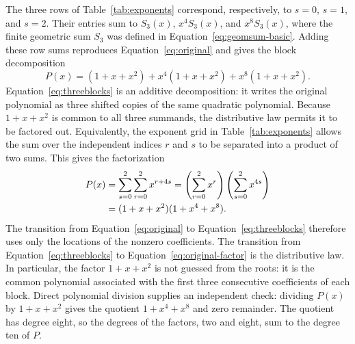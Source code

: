 \documentclass[11pt,a4paper]{article}
\numberwithin{equation}{section}
\theoremstyle{uprightpaper}
\begin{document}
The three rows of Table~\ref{tab:exponents} correspond,
respectively, to $s=0$, $s=1$, and $s=2$. Their entries sum to
$S_3(x)$, $x^4S_3(x)$, and $x^8S_3(x)$, where the finite
geometric sum $S_3$ was defined in Equation~\eqref{eq:geomsum-basic}.
Adding these row sums reproduces Equation~\eqref{eq:original} and
gives the block decomposition
\begin{equation}\label{eq:threeblocks}
 P(x)=(1+x+x^2)+x^4(1+x+x^2)+x^8(1+x+x^2).
\end{equation}
Equation~\eqref{eq:threeblocks} is an additive decomposition:
it writes the original polynomial as three shifted copies of
the same quadratic polynomial. Because $1+x+x^2$ is common to
all three summands, the distributive law permits it to be
factored out. Equivalently, the exponent grid in
Table~\ref{tab:exponents} allows the sum over the independent
indices $r$ and $s$ to be separated into a product of two sums.
This gives the factorization
\begin{align}
P(x)&=\sum_{s=0}^{2}\sum_{r=0}^{2}x^{r+4s}
      =\left(\sum_{r=0}^{2}x^r\right)
       \left(\sum_{s=0}^{2}x^{4s}\right)\notag\\
    &=(1+x+x^2)(1+x^4+x^8).\label{eq:original-factor}
\end{align}
The transition from Equation~\eqref{eq:original} to
Equation~\eqref{eq:threeblocks} therefore uses only the locations of
the nonzero coefficients. The transition from
Equation~\eqref{eq:threeblocks} to Equation~\eqref{eq:original-factor}
is the distributive law. In particular, the factor
$1+x+x^2$ is not guessed from the roots: it is the common
polynomial associated with the first three consecutive
coefficients of each block. Direct polynomial division supplies
an independent check: dividing $P(x)$ by $1+x+x^2$ gives the
quotient $1+x^4+x^8$ and zero remainder. The quotient has
degree eight, so the degrees of the factors, two and eight,
sum to the degree ten of $P$.
\end{document}

